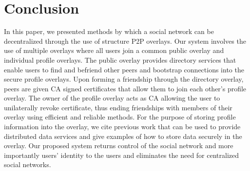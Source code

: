 \documentclass[letterpaper,twocolumn,10pt]{article}
\begin{document}
\section{Conclusion}
\label{conclusion}
In this paper, we presented methods by which a social network can be
decentralized through the use of structure P2P overlays.  Our system involves
the use of multiple overlays where all users join a common public overlay and
individual profile overlays.  The public overlay provides directory services
that enable users to find and befriend other peers and bootstrap connections
into the secure profile overlays.  Upon forming a friendship through the
directory overlay, peers are given CA signed certificates that allow them to
join each other's profile overlay.  The owner of the profile overlay acts as
CA allowing the user to unilaterally revoke certificate, thus ending
friendships with members of their overlay using efficient and reliable methods.
For the purpose of storing profile information into the overlay, we cite
previous work that can be used to provide distributed data services and give
examples of how to store data securely in the overlay.  Our proposed system
returns control of the social network and more importantly users' identity to
the users and eliminates the need for centralized social networks.


\small{

\suppressfloats
}
\end{document}
